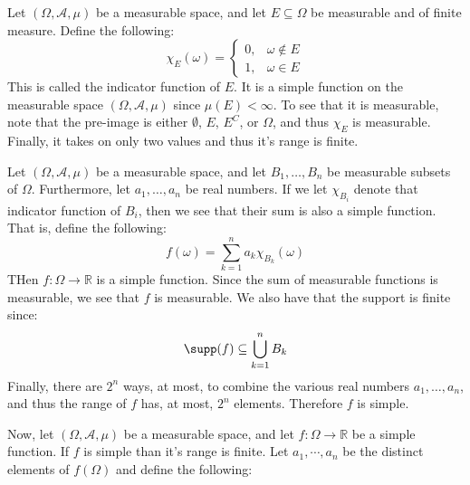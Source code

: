     \begin{lexample}
        Let $(\Omega,\mathcal{A},\mu)$ be a measurable space, and let
        $E\subseteq\Omega$ be measurable and of finite measure. Define the
        following:
        \begin{equation}
            \chi_{E}(\omega)=
            \begin{cases}
                0,&\omega\notin{E}\\
                1,&\omega\in{E}
            \end{cases}
        \end{equation}
        This is called the indicator function of $E$. It is a simple function
        on the measurable space $(\Omega,\mathcal{A},\mu)$ since
        $\mu(E)<\infty$. To see that it is measurable, note that the pre-image
        is either $\emptyset$, $E$, $E^{C}$, or $\Omega$, and thus $\chi_{E}$
        is measurable. Finally, it takes on only two values and thus it's range
        is finite.
    \end{lexample}
    \begin{lexample}
        Let $(\Omega,\mathcal{A},\mu)$ be a measurable space, and let
        $B_{1},\dots,B_{n}$ be measurable subsets of $\Omega$. Furthermore, let
        $a_{1},\dots,a_{n}$ be real numbers. If we let $\chi_{B_{i}}$ denote
        that indicator function of $B_{i}$, then we see that their sum is also a
        simple function. That is, define the following:
        \begin{equation}
            f(\omega)=\sum_{k=1}^{n}a_{k}\chi_{B_{k}}(\omega)
        \end{equation}
        THen $f:\Omega\rightarrow\mathbb{R}$ is a simple function. Since the
        sum of measurable functions is measurable, we see that $f$ is
        measurable. We also have that the support is finite since:
        \begin{equation}
            \supp(f)\subseteq\bigcup_{k=1}^{n}B_{k}
        \end{equation}
        Finally, there are $2^{n}$ ways, at most, to combine the various real
        numbers $a_{1},\dots,a_{n}$, and thus the range of $f$ has, at most,
        $2^{n}$ elements. Therefore $f$ is simple.
    \end{lexample}
    Now, let $(\Omega,\mathcal{A},\mu)$ be a measurable space, and let
    $f:\Omega\rightarrow\mathbb{R}$ be a simple function. If $f$ is simple than
    it's range is finite. Let $a_{1},\cdots,a_{n}$ be the distinct elements of
    $f(\Omega)$ and define the following:
